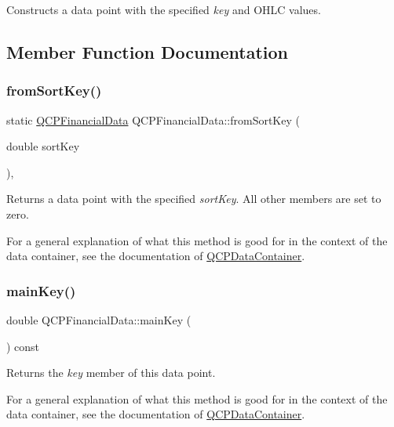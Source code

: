 Constructs a data point with the specified {\itshape key} and O\+H\+LC values. 

\subsection{Member Function Documentation}
\mbox{\label{class_q_c_p_financial_data_a54a0ca7ee7fd7713972477e8e2533ce5}} 
\subsubsection{\texorpdfstring{fromSortKey()}{fromSortKey()}}
{\footnotesize\ttfamily static \mbox{\hyperlink{class_q_c_p_financial_data}{Q\+C\+P\+Financial\+Data}} Q\+C\+P\+Financial\+Data\+::from\+Sort\+Key (\begin{DoxyParamCaption}\item[{double}]{sort\+Key }\end{DoxyParamCaption})\hspace{0.3cm}{\ttfamily [inline]}, {\ttfamily [static]}}

Returns a data point with the specified {\itshape sort\+Key}. All other members are set to zero.

For a general explanation of what this method is good for in the context of the data container, see the documentation of \mbox{\hyperlink{class_q_c_p_data_container}{Q\+C\+P\+Data\+Container}}. \mbox{\label{class_q_c_p_financial_data_af6ed6349c65d938fabd2e4dd2cd499ff}} 
\subsubsection{\texorpdfstring{mainKey()}{mainKey()}}
{\footnotesize\ttfamily double Q\+C\+P\+Financial\+Data\+::main\+Key (\begin{DoxyParamCaption}{ }\end{DoxyParamCaption}) const\hspace{0.3cm}{\ttfamily [inline]}}

Returns the {\itshape key} member of this data point.

For a general explanation of what this method is good for in the context of the data container, see the documentation of \mbox{\hyperlink{class_q_c_p_data_container}{Q\+C\+P\+Data\+Container}}. \mbox{\label{class_q_c_p_financial_data_a65206c76b6f31a57e04dc7da88c9be60}} 
